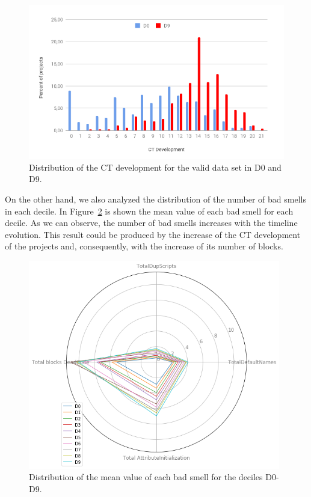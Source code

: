 \begin{figure}
    \centering
    \includegraphics[width=12cm,                         keepaspectratio]{img/CT_development.png}
    \caption{Distribution of the CT development for the valid data set in D0 and D9.}
    \label{fig:ct_development}
\end{figure}

On the other hand, we also analyzed the distribution of the number of bad smells in each decile. In Figure~\ref{fig:bad_smells_deciles} is shown the mean value of each bad smell for each decile. As we can observe, the number of bad smells increases with the timeline evolution. This result could be produced by the increase of the CT development of the projects and, consequently, with the increase of its number of blocks.

\begin{figure}
    \centering
    \includegraphics[width=11cm,                         keepaspectratio]{img/bad_smells_deciles.png}
    \caption{Distribution of the mean value of each bad smell for the deciles D0-D9.}
    \label{fig:bad_smells_deciles}
\end{figure}


